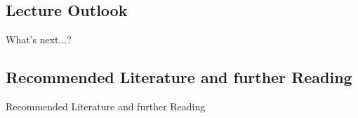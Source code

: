 \subsection{Lecture Outlook}

\begin{frame}{What's next...?}{}
\end{frame}


\subsection{Recommended Literature and further Reading}

\begin{frame}{Recommended Literature and further Reading}{}
	\footnotesize
	\begin{thebibliography}{2}

	\end{thebibliography}
\end{frame}


\makethanks

